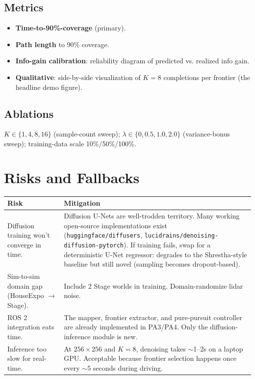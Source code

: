 \documentclass[11pt]{article}
\begin{document}
\subsection{Metrics}
\begin{itemize}[itemsep=0pt,topsep=0pt]
  \item \textbf{Time-to-90\%-coverage} (primary).
  \item \textbf{Path length} to 90\% coverage.
  \item \textbf{Info-gain calibration}: reliability diagram of predicted vs. realized info gain.
  \item \textbf{Qualitative}: side-by-side visualization of $K=8$ completions per frontier (the headline demo figure).
\end{itemize}

\subsection{Ablations}
$K \in \{1, 4, 8, 16\}$ (sample-count sweep); $\lambda \in \{0, 0.5, 1.0, 2.0\}$ (variance-bonus sweep); training-data scale 10\%/50\%/100\%.

\section{Risks and Fallbacks}

\begin{tabular}{p{} p{}}
\toprule
\textbf{Risk} & \textbf{Mitigation} \\
\midrule
Diffusion training won't converge in time. & Diffusion U-Nets are well-trodden territory. Many working open-source implementations exist (\texttt{huggingface/diffusers}, \texttt{lucidrains/denoising-diffusion-pytorch}). If training fails, swap for a deterministic U-Net regressor: degrades to the Shrestha-style baseline but still novel (sampling becomes dropout-based). \\
\addlinespace
Sim-to-sim domain gap (HouseExpo $\to$ Stage). & Include 2 Stage worlds in training. Domain-randomize lidar noise. \\
\addlinespace
ROS 2 integration eats time. & The mapper, frontier extractor, and pure-pursuit controller are already implemented in PA3/PA4. Only the diffusion-inference module is new. \\
\addlinespace
Inference too slow for real-time. & At $256\times256$ and $K=8$, denoising takes $\sim$1--2s on a laptop GPU. Acceptable because frontier selection happens once every $\sim$5 seconds during driving. \\
\bottomrule
\end{tabular}
\end{document}
